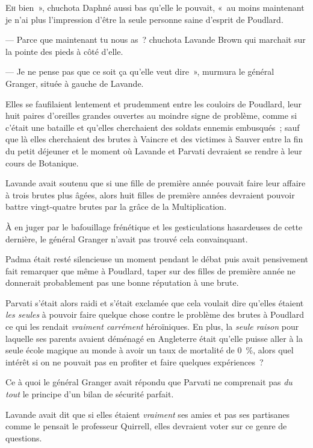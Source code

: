 
\lettrine[ante=«~]{E}{h} bien~», chuchota Daphné aussi bas qu'elle le pouvait, «~au moins maintenant je n'ai plus l'impression d'être la seule personne saine d'esprit de Poudlard.

--- Parce que maintenant tu nous as~? chuchota Lavande Brown qui marchait sur la pointe des pieds à côté d'elle.

--- Je ne pense pas que ce soit ça qu'elle veut dire~», murmura le général Granger, située à gauche de Lavande.

Elles se faufilaient lentement et prudemment entre les couloirs de Poudlard, leur huit paires d'oreilles grandes ouvertes au moindre signe de problème, comme si c'était une bataille et qu'elles cherchaient des soldats ennemis embusqués~; sauf que là elles cherchaient des brutes à Vaincre et des victimes à Sauver entre la fin du petit déjeuner et le moment où Lavande et Parvati devraient se rendre à leur cours de Botanique.

Lavande avait soutenu que si une fille de première année pouvait faire leur affaire à trois brutes plus âgées, alors huit filles de première années devraient pouvoir battre vingt-quatre brutes par la grâce de la Multiplication.

À en juger par le bafouillage frénétique et les gesticulations hasardeuses de cette dernière, le général Granger n'avait pas trouvé cela convainquant.

Padma était resté silencieuse un moment pendant le débat puis avait pensivement fait remarquer que même à Poudlard, taper sur des filles de première année ne donnerait probablement pas une bonne réputation à une brute.

Parvati s'était alors raidi et s'était exclamée que cela voulait dire qu'elles étaient \emph{les seules} à pouvoir faire quelque chose contre le problème des brutes à Poudlard ce qui les rendait \emph{vraiment carrément} héroïniques. En plus, la \emph{seule raison} pour laquelle ses parents avaient déménagé en Angleterre était qu'elle puisse aller à la seule école magique au monde à avoir un taux de mortalité de 0~\%, alors quel intérêt si on ne pouvait pas en profiter et faire quelques expériences~?

Ce à quoi le général Granger avait répondu que Parvati ne comprenait pas \emph{du tout} le principe d'un bilan de sécurité parfait.

Lavande avait dit que si elles étaient \emph{vraiment} ses amies et pas ses partisanes comme le pensait le professeur Quirrell, elles devraient voter sur ce genre de questions.

